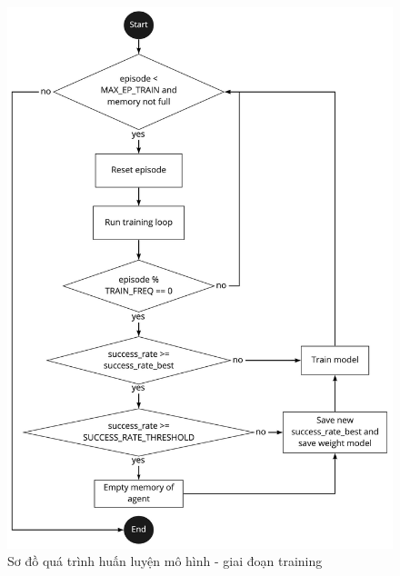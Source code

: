 \begin{figure}[!ht]
    \centering
    \includegraphics[scale=0.24]{thesis/chatbot/phuongphap/img/training_flow.jpg}
    \caption{Sơ đồ quá trình huấn luyện mô hình - giai đoạn training}
    \label{fig:trainingflow}
\end{figure}

